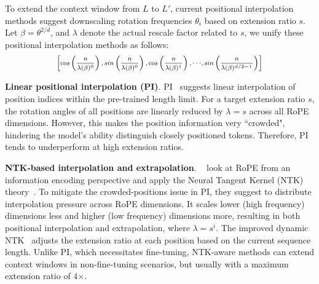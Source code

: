 \documentclass{article}
\theoremstyle{plain}
\theoremstyle{definition}
\theoremstyle{remark}
\begin{document}
To extend the context window from $L$ to $L'$, current positional interpolation methods
suggest downscaling rotation frequencies $\theta_i$ based on extension ratio $s$. Let $\beta=\theta^{2/d}$, and $\lambda$ denote the actual rescale factor related to $s$,  
we   unify these positional interpolation methods as follows:
\vspace{-1ex}
\begin{equation}	
	\fontsize{7.5}{7.5} \selectfont
	\label{eq:unified_rope}
	\begin{aligned}
		\left[cos\left(\frac{n}{\lambda(\beta)^0}\right), sin \left(\frac{n}{\lambda(\beta)^0}\right), cos\left(\frac{n}{\lambda(\beta)^1}\right), \cdot\cdot\cdot,  sin \left(\frac{n}{\lambda(\beta)^{d/2-1}}\right) \right]   
	\end{aligned}
\end{equation}





\noindent\textbf{Linear positional interpolation (PI)}. PI~\cite{pi}  suggests linear interpolation of position indices within the pre-trained length limit. 
For a target extension ratio $s$, the rotation angles of all positions are linearly reduced by $\lambda=s$  across all RoPE dimensions.
 However, this makes the position information very ``crowded", hindering the model's ability distinguish closely positioned tokens. Therefore, PI tends to underperform at high extension ratios.




\noindent\textbf{NTK-based interpolation and extrapolation}. 
~\cite{ntk,dynamicntk} look at RoPE from an information encoding perspective  and 
apply the Neural Tangent Kernel (NTK) theory~\cite{jacot2018neural,tancik2020fourier}.
To mitigate the crowded-positions issue in PI, they suggest to distribute 
 interpolation pressure across RoPE dimensions. 
 It scales lower (high frequency) dimensions less and higher (low frequency) dimensions more, resulting in  both positional interpolation and extrapolation, where $\lambda=s^{i}$. The improved dynamic NTK~\cite{dynamicntk}  adjusts the extension ratio at each position based on the current sequence length. Unlike PI, which necessitates fine-tuning, NTK-aware methods can extend context windows in non-fine-tuning scenarios, but usually with a maximum extension ratio of 4$\times$. 
\end{document}

